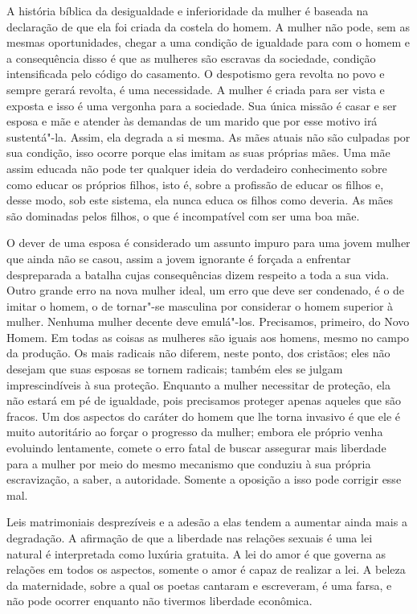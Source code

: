 A história bíblica da desigualdade e inferioridade da mulher é baseada
na declaração de que ela foi criada da costela do homem. A mulher não
pode, sem as mesmas oportunidades, chegar a uma condição de igualdade
para com o homem e a consequência disso é que as mulheres são escravas
da sociedade, condição intensificada pelo código do casamento. O
despotismo gera revolta no povo e sempre gerará revolta, é uma
necessidade. A mulher é criada para ser vista e exposta e isso é uma
vergonha para a sociedade. Sua única missão é casar e ser esposa e mãe e
atender às demandas de um marido que por esse motivo irá sustentá"-la.
Assim, ela degrada a si mesma. As mães atuais não são culpadas por
sua condição, isso ocorre porque elas imitam as suas próprias mães. Uma
mãe assim educada não pode ter qualquer ideia do verdadeiro conhecimento
sobre como educar os próprios filhos, isto é, sobre a profissão de
educar os filhos e, desse modo, sob este sistema, ela nunca educa os
filhos como deveria. As mães são dominadas pelos filhos, o que é
incompatível com ser uma boa mãe.

O dever de uma esposa é considerado um assunto impuro para uma jovem
mulher que ainda não se casou, assim a jovem ignorante é forçada a
enfrentar despreparada a batalha cujas consequências dizem respeito a toda a sua vida.
Outro grande erro na nova mulher ideal, um erro que deve ser condenado,
é o de imitar o homem, o de tornar"-se masculina por considerar o homem
superior à mulher. Nenhuma mulher decente deve emulá"-los. Precisamos,
primeiro, do Novo Homem. Em todas as coisas as mulheres são iguais aos
homens, mesmo no campo da produção. Os mais radicais não diferem, neste
ponto, dos cristãos; eles não desejam que suas esposas se tornem
radicais; também eles se julgam imprescindíveis à sua proteção. Enquanto
a mulher necessitar de proteção, ela não estará em pé de igualdade, pois
precisamos proteger apenas aqueles que são fracos. Um dos aspectos do
caráter do homem que lhe torna invasivo é que ele é muito autoritário
ao forçar o progresso da mulher; embora ele próprio venha
evoluindo lentamente, comete o erro fatal de buscar assegurar mais
liberdade para a mulher por meio do mesmo mecanismo que conduziu à sua própria
escravização, a saber, a autoridade. Somente a oposição a isso pode
corrigir esse mal.

Leis matrimoniais desprezíveis e a adesão a elas tendem a aumentar ainda
mais a degradação. A afirmação de que a liberdade nas relações sexuais é
uma lei natural é interpretada como luxúria gratuita. A lei do amor é
que governa as relações em todos os aspectos, somente o amor é capaz de
realizar a lei. A beleza da maternidade, sobre a qual os poetas cantaram
e escreveram, é uma farsa, e não pode ocorrer enquanto não tivermos
liberdade econômica.\label{maternidade}


